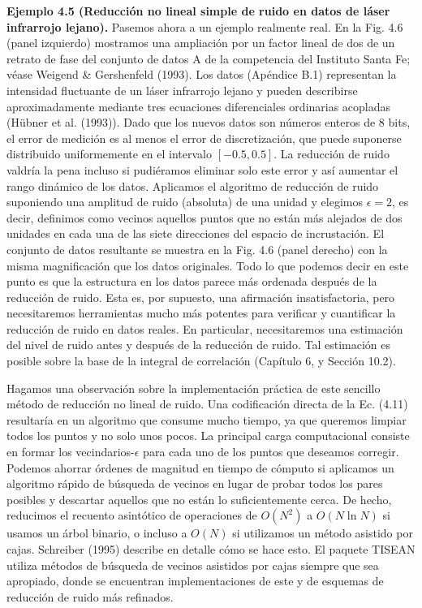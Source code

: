 \documentclass[10pt,a4paper]{book}
\begin{document}
\textbf{Ejemplo 4.5 (Reducción no lineal simple de ruido en datos de láser infrarrojo lejano).} Pasemos ahora a un ejemplo realmente real. En la Fig. 4.6 (panel izquierdo) mostramos una ampliación por un factor lineal de dos de un retrato de fase del conjunto de datos A de la competencia del Instituto Santa Fe; véase Weigend \& Gershenfeld (1993). Los datos (Apéndice B.1) representan la intensidad fluctuante de un láser infrarrojo lejano y pueden describirse aproximadamente mediante tres ecuaciones diferenciales ordinarias acopladas (Hübner et al. (1993)). Dado que los nuevos datos son números enteros de 8 bits, el error de medición es al menos el error de discretización, que puede suponerse distribuido uniformemente en el intervalo $[-0.5,0.5]$. La reducción de ruido valdría la pena incluso si pudiéramos eliminar solo este error y así aumentar el rango dinámico de los datos. Aplicamos el algoritmo de reducción de ruido suponiendo una amplitud de ruido (absoluta) de una unidad y elegimos $\epsilon = 2$, es decir, definimos como vecinos aquellos puntos que no están más alejados de dos unidades en cada una de las siete direcciones del espacio de incrustación. El conjunto de datos resultante se muestra en la Fig. 4.6 (panel derecho) con la misma magnificación que los datos originales. Todo lo que podemos decir en este punto es que la estructura en los datos parece más ordenada después de la reducción de ruido. Esta es, por supuesto, una afirmación insatisfactoria, pero necesitaremos herramientas mucho más potentes para verificar y cuantificar la reducción de ruido en datos reales. En particular, necesitaremos una estimación del nivel de ruido antes y después de la reducción de ruido. Tal estimación es posible sobre la base de la integral de correlación (Capítulo 6, y Sección 10.2).

\bigskip

Hagamos una observación sobre la implementación práctica de este sencillo método de reducción no lineal de ruido. Una codificación directa de la Ec. (4.11) resultaría en un algoritmo que consume mucho tiempo, ya que queremos limpiar todos los puntos y no solo unos pocos. La principal carga computacional consiste en formar los vecindarios-$\epsilon$ para cada uno de los puntos que deseamos corregir. Podemos ahorrar órdenes de magnitud en tiempo de cómputo si aplicamos un algoritmo rápido de búsqueda de vecinos en lugar de probar todos los pares posibles y descartar aquellos que no están lo suficientemente cerca. De hecho, reducimos el recuento asintótico de operaciones de $O(N^2)$ a $O(N \ln N)$ si usamos un árbol binario, o incluso a $O(N)$ si utilizamos un método asistido por cajas. Schreiber (1995) describe en detalle cómo se hace esto. El paquete TISEAN utiliza métodos de búsqueda de vecinos asistidos por cajas siempre que sea apropiado, donde se encuentran implementaciones de este y de esquemas de reducción de ruido más refinados.
\end{document}
